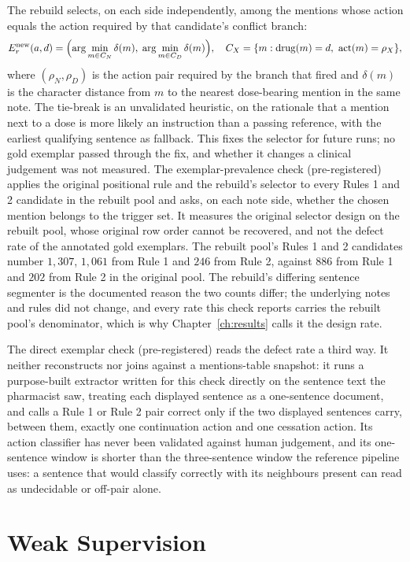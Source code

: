 The rebuild selects, on each side independently, among the mentions whose action equals
the action required by that candidate's conflict branch:
\[
E_r^{\text{new}}(a,d) = \Bigl(\arg\min_{m \in C_N} \delta(m),\;
\arg\min_{m \in C_D} \delta(m)\Bigr),
\quad
C_X = \{m : \mathrm{drug}(m) = d,\ \mathrm{act}(m) = \rho_X\},
\]
where $(\rho_N, \rho_D)$ is the action pair required by the branch that fired and $\delta(m)$ is
the character distance from $m$ to the nearest dose-bearing mention in the same note. The tie-break is an unvalidated heuristic, on the rationale that a mention next to a dose is more
likely an instruction than a passing reference, with the earliest qualifying sentence as fallback.
This fixes the selector for future runs; no gold exemplar passed through the fix, and whether it
changes a clinical judgement was not measured. The exemplar-prevalence check (pre-registered) applies
the original positional rule and the rebuild's selector to every Rules 1 and 2 candidate in the
rebuilt pool and asks, on each note side, whether the chosen mention belongs to the trigger set. It
measures the original selector design on the rebuilt pool, whose original row order cannot
be recovered, and not the defect rate of the annotated gold exemplars. The rebuilt pool's Rules 1 and 2 candidates number $1{,}307$, $1{,}061$ from Rule 1
and $246$ from Rule 2, against $886$ from Rule 1 and $202$ from Rule 2 in the original pool. The rebuild's differing sentence segmenter is the documented reason the two counts differ;
the underlying notes and rules did not change, and every rate this check reports carries the
rebuilt pool's denominator, which is why Chapter~\ref{ch:results} calls it the design rate.

The direct exemplar check (pre-registered) reads the defect rate a third way. It neither reconstructs nor joins against a mentions-table snapshot: it runs a purpose-built extractor
written for this check directly on the sentence text the pharmacist saw, treating each displayed
sentence as a one-sentence document, and calls a Rule 1 or Rule 2 pair correct only if the two
displayed sentences carry, between them, exactly one continuation action and one cessation action.
 Its action classifier has never been validated
against human judgement, and its one-sentence window is shorter than the three-sentence window the
reference pipeline uses: a sentence that would classify correctly with its neighbours present can
read as undecidable or off-pair alone.

\section{Weak Supervision}
\label{sec:m-weak}

